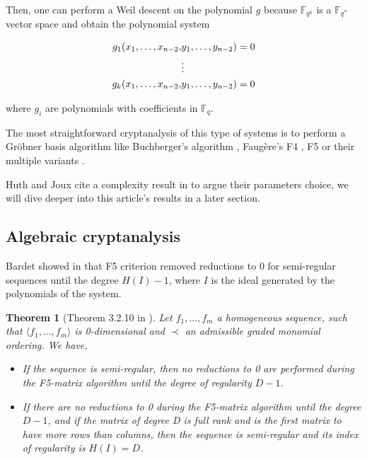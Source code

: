 \documentclass[english]{article}
\newtheorem{theorem}{Theorem}[section]
\begin{document}
		Then, one can perform a Weil descent on the polynomial $g$ because $\mathbb{F}_{q^k}$ is a $\mathbb{F}_q$-vector space and obtain the polynomial system
		

		\begin{align}
			g_1(x_1, \dots, x_{n-2},& y_1, \dots, y_{n-2}) = 0 \notag \\
			&\vdots \notag \\
			g_k(x_1, \dots, x_{n-2},& y_1, \dots, y_{n-2}) = 0 \notag
		\end{align}
		
		where $g_i$ are polynomials with coefficients in $\mathbb{F}_q$.
		
		The most straightforward cryptanalysis of this type of systems is to perform a Gröbner basis algorithm like Buchberger's algorithm \cite{Buc}, Faugère's F4 \cite{F99}, F5 \cite{F02} or their multiple variants \cite{EF19}.
		
		Huth and Joux cite a complexity result in \cite{FSS11} to argue their parameters choice, we will dive deeper into this article's results in a later section.

		\subsection{Algebraic cryptanalysis}
		
		Bardet showed in \cite{Bardet04} that F5 criterion removed reductions to 0 for semi-regular sequences until the degree $H(I) - 1$, where $I$ is the ideal generated by the polynomials of the system.
		
		\begin{theorem}[Theorem 3.2.10 in \cite{Bardet04}]
			Let $f_1,...,f_m$ a homogeneous sequence, such that $\langle f_1,...,f_m \rangle$ is 0-dimensional and
			$\prec$ an admissible graded monomial ordering. We have,
			\begin{itemize}
				\item[-] If the sequence is semi-regular, then no reductions to 0 are performed during the F5-matrix algorithm until the degree of regularity $D - 1$.
				\item[-] If there are no reductions to 0 during the F5-matrix algorithm until the degree $D - 1$, and if the matrix of degree D is full rank and is the first matrix to have more rows than columns, then the sequence is semi-regular and its index of regularity is $H(I) = D$.
			\end{itemize}
		\end{theorem}
		
\end{document}
